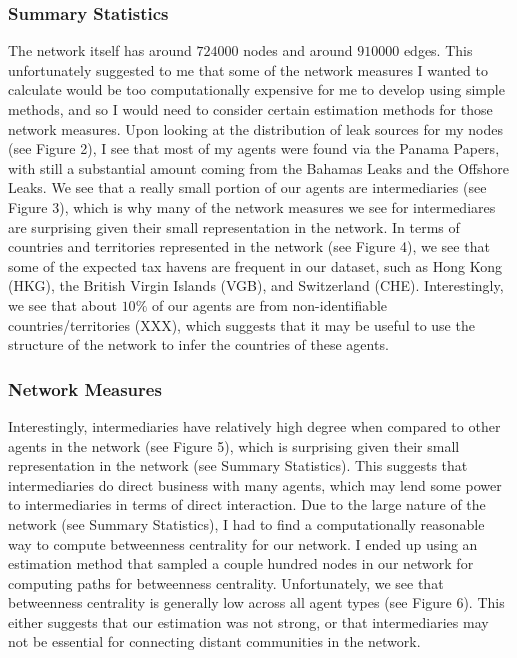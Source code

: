 \documentclass[11pt]{article}
\begin{document}
\subsubsection{Summary Statistics}

The network itself has around $724000$ nodes and around $910000$ edges. This
unfortunately suggested to me that some of the network measures I wanted to
calculate would be too computationally expensive for me to develop using simple
methods, and so I would need to consider certain estimation methods for those
network measures. Upon looking at the distribution of leak sources for my nodes
(see Figure 2), I see that most of my agents were found via the Panama Papers,
with still a substantial amount coming from the Bahamas Leaks and the Offshore
Leaks. We see that a really small portion of our agents are intermediaries
(see Figure 3), which is why many of the network measures we see for
intermediares are surprising given their small representation in the network.
In terms of countries and territories represented in the network (see Figure 4),
we see that some of the expected tax havens are frequent in our dataset, such
as Hong Kong (HKG), the British Virgin Islands (VGB), and Switzerland (CHE).
Interestingly, we see that about $10\%$ of our agents are from non-identifiable
countries/territories (XXX), which suggests that it may be useful to use the
structure of the network to infer the countries of these agents.

\subsubsection{Network Measures}

Interestingly, intermediaries have relatively high degree when compared to
other agents in the network (see Figure 5), which is surprising given their
small representation in the network (see Summary Statistics). This suggests that
intermediaries do direct business with many agents, which may lend some power
to intermediaries in terms of direct interaction. Due to the large nature of
the network (see Summary Statistics), I had to find a computationally reasonable
way to compute betweenness centrality for our network. I ended up using an
estimation method that sampled a couple hundred nodes in our network for
computing paths for betweenness centrality. Unfortunately, we see that
betweenness centrality is generally low across all agent types (see Figure 6).
This either suggests that our estimation was not strong, or that intermediaries
may not be essential for connecting distant communities in the network.
\end{document}
